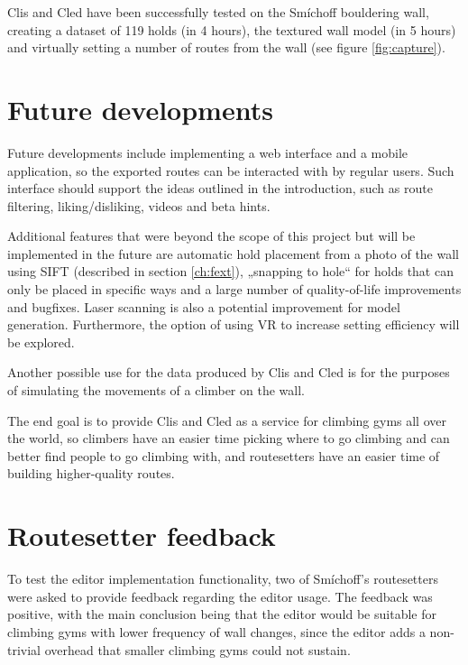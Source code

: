 \label{sec:conclusion}
Clis and Cled have been successfully tested on the Smíchoff bouldering wall, creating a dataset of 119 holds (in 4 hours), the textured wall model (in 5 hours) and virtually setting a number of routes from the wall (see figure \ref{fig:capture}).

\setcounter{secnumdepth}{0}

\section{Future developments}
Future developments include implementing a web interface and a mobile application, so the exported routes can be interacted with by regular users.
Such interface should support the ideas outlined in the introduction, such as route filtering, liking/disliking, videos and beta hints.

Additional features that were beyond the scope of this project but will be implemented in the future are automatic hold placement from a photo of the wall using SIFT (described in section \ref{ch:fext}), „snapping to hole“ for holds that can only be placed in specific ways and a large number of quality-of-life improvements and bugfixes.
Laser scanning is also a potential improvement for model generation.
Furthermore, the option of using VR to increase setting efficiency will be explored.

Another possible use for the data produced by Clis and Cled is for the purposes of simulating the movements of a climber on the wall.

The end goal is to provide Clis and Cled as a service for climbing gyms all over the world, so climbers have an easier time picking where to go climbing and can better find people to go climbing with, and routesetters have an easier time of building higher-quality routes.

\section{Routesetter feedback}
To test the editor implementation functionality, two of Smíchoff's routesetters were asked to provide feedback regarding the editor usage.
The feedback was positive, with the main conclusion being that the editor would be suitable for climbing gyms with lower frequency of wall changes, since the editor adds a non-trivial overhead that smaller climbing gyms could not sustain.

\setcounter{secnumdepth}{3}
